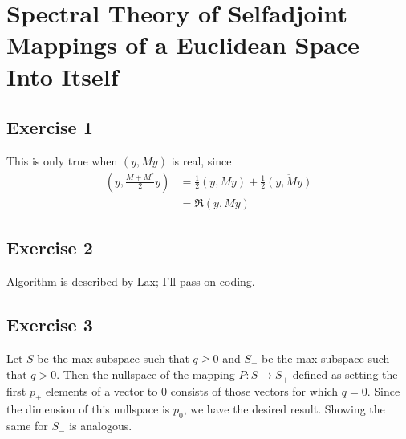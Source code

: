 \section{Spectral Theory of Selfadjoint Mappings of a Euclidean Space Into Itself}

\subsection{Exercise 1}
This is only true when $(y, My)$ is real, since
\begin{align*}
        (y, \frac{M + M^{*}}{2}y) &= \frac{1}{2} (y, My) + \frac{1}{2} \overline{(y, My)} \\
                                  &= \Re (y, My)
\end{align*}

\subsection{Exercise 2}
Algorithm is described by Lax; I'll pass on coding.

\subsection{Exercise 3}
Let $S$ be the max subspace such that $q \geq 0$ and $S_+$ be the max subspace such that $q > 0$.
Then the nullspace of the mapping $P: S \to S_+$ defined as setting the first $p_+$ elements of a vector to 0 
consists of those vectors for which $q = 0$. Since the dimension of this nullspace is $p_0$, we have the
desired result. Showing the same for $S_-$ is analogous.


